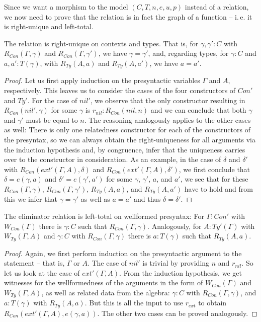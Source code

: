 Since we want a morphism to the model $(C, T, n, e, u, p)$ instead of a relation,
we now need to prove that the relation is in fact the graph of a function --
i.\,e. it is right-unique and left-total.

\begin{lemma}\label{lem:red-ex-right-unique}
The relation is right-unique on contexts and types. That is, for
$\gamma, \gamma' : C$ with $R_{Con}(\Gamma, \gamma)$ and $R_{Con}(\Gamma, \gamma')$,
we have $\gamma = \gamma'$, and, regarding types, for $\gamma : C$ and
$a, a' : T(\gamma)$, with $R_{Ty}(A, a)$ and $R_{Ty}(A, a')$,
we have $a = a'$.
\end{lemma}

\begin{proof}
Let us first apply induction on the presyntactic variables $\Gamma$ and $A$,
respectively.
This leaves us to consider the cases of the four constructors of $Con'$ and $Ty'$.
For the case of $nil'$, we observe that the only constructor resulting in
$R_{Con}(nil', \gamma)$ for some $\gamma$ is $r_{nil} : R_{Con}(nil, n)$ and we
can conclude that both $\gamma$ and $\gamma'$ must be equal to $n$.
The reasoning analogously applies to the other cases as well:
There is only one relatedness constructor for each of the constructors of the
presyntax, so we can always obtain the right-uniqueness for all arguments via
the induction hypothesis and, by congruence, infer that the uniqueness carries
over to the constructor in consideration.
As an example, in the case of $\delta$ and $\delta'$ with $R_{Con}(ext'(\Gamma, A), \delta)$
and $R_{Con}(ext'(\Gamma, A), \delta')$, we first conclude that
$\delta = e(\gamma, a)$ and $\delta' = e(\gamma', a')$ for some $\gamma$, $\gamma'$,
$a$, and $a'$, we see that for these $R_{Con}(\Gamma, \gamma)$, $R_{Con}(\Gamma, \gamma')$,
$R_{Ty}(A, a)$, and $R_{Ty}(A, a')$ have to hold and from this we infer
that $\gamma = \gamma'$ as well as $a = a'$ and thus $\delta = \delta'$.
\end{proof}

\begin{lemma}\label{lem:red-ex-total}
The eliminator relation is left-total on wellformed presyntax:
For $\Gamma : Con'$ with $W_{Con}(\Gamma)$ there is $\gamma : C$
such that $R_{Con}(\Gamma, \gamma)$.
Analogously, for $A : Ty'(\Gamma)$ with $W_{Ty}(\Gamma, A)$
and $\gamma : C$ with $R_{Con}(\Gamma, \gamma)$
there is $a : T(\gamma)$
such that $R_{Ty}(A, a)$.
\end{lemma}

\begin{proof}
Again, we first perform induction on the presyntactic argument to the statement
-- that is, $\Gamma$ or $A$.
The case of $nil'$ is trivial by providing $n$ and $r_{nil}$.
So let us look at the case of $ext'(\Gamma, A)$.
From the induction hypothesis, we get witnesses for the wellformedness of the
arguments in the form of $W_{Con}(\Gamma)$ and $W_{Ty}(\Gamma, A)$,
as well as related data from the algebra:
$\gamma : C$ with $R_{Con}(\Gamma, \gamma)$, and
$a : T(\gamma)$ with $R_{Ty}(A, a)$.
But this is all the input to use $r_{ext}$ to obtain $R_{Con}(ext'(\Gamma, A), e(\gamma, a))$.
The other two cases can be proved analogously.
\end{proof}

